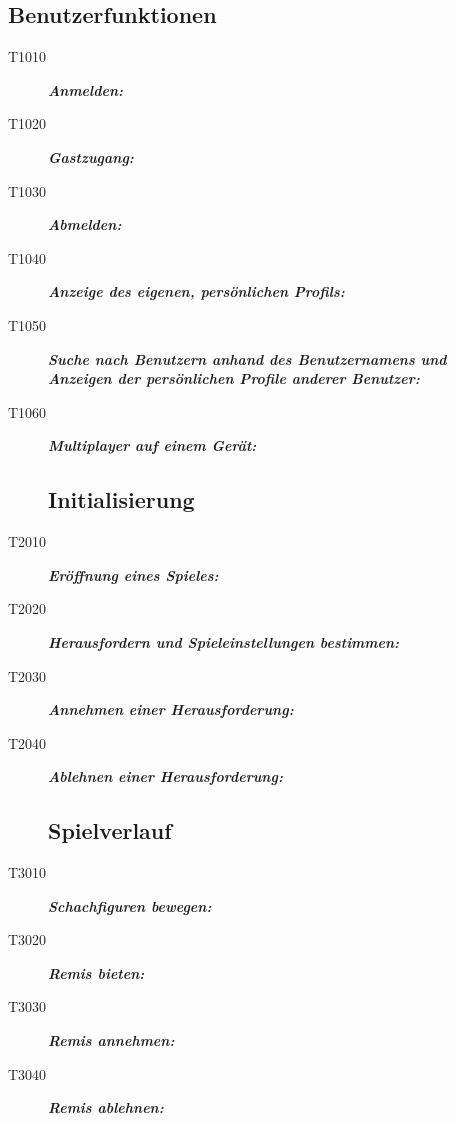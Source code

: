 \documentclass[parskip=full]{scrartcl}
\begin{document}
\subsection{Benutzerfunktionen}
\begin{description}
	\item[T1010] \textbf{\textit{Anmelden: }} \\

	\item[T1020]  \textbf{\textit{Gastzugang: }} 

	\item[T1030] \textbf{\textit{Abmelden: }} 
	
	\item[T1040] \textbf{\textit{Anzeige des eigenen, persönlichen Profils: }} 
	
	\item[T1050] \textbf{\textit{Suche nach Benutzern anhand des Benutzernamens und Anzeigen der persönlichen Profile anderer Benutzer: }} 
	
	\item[T1060] \textbf{\textit{Multiplayer auf einem Gerät: }} 
	
	\subsection{Initialisierung}
	\item[T2010] \textbf{\textit{Eröffnung eines Spieles: }} 

	
	\item[T2020] \textbf{\textit{Herausfordern und Spieleinstellungen bestimmen: }} 

	
	\item[T2030] \textbf{\textit{Annehmen einer Herausforderung: }} 

	
	\item[T2040] \textbf{\textit{Ablehnen einer Herausforderung: }} 

	
	\subsection{Spielverlauf}
	\item[T3010] \textbf{\textit{Schachfiguren bewegen: }} 
		
	
	\item[T3020] \textbf{\textit{Remis bieten: }} 

	
	\item[T3030] \textbf{\textit{Remis annehmen: }} 

	
	\item[T3040] \textbf{\textit{Remis ablehnen: }} 


\end{description}
\end{document}
